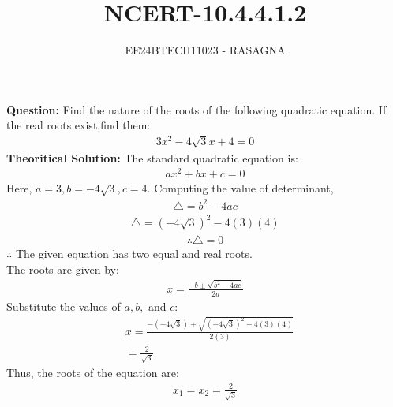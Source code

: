 \documentclass[journal]{IEEEtran}
\begin{document}

\vspace{3cm}

\title{NCERT-10.4.4.1.2}
\author{EE24BTECH11023 - RASAGNA}

{\let\newpage\relax\maketitle}

\renewcommand{\thefigure}{\theenumi}
\renewcommand{\thetable}{\theenumi}
\setlength{\intextsep}{10pt} %


\renewcommand{\thetable}{\theenumi}
\textbf{Question:}
Find the nature of the roots of the following quadratic equation. If the real roots exist,find them:
\begin{align*}
    3x^2-4{\sqrt{3}}x+4=0
\end{align*}
\textbf{Theoritical Solution:}
The standard quadratic equation is:
\begin{align}
    ax^2 + bx + c = 0
\end{align}
Here, \( a = 3, b = -4{\sqrt{3}}, c = 4 \).
Computing the value of determinant,
\begin{align}
    \triangle =b^2-4ac
\end{align}
\begin{align}
    \triangle =(-4{\sqrt{3}})^2-4(3)(4)
\end{align}
\begin{align}
    \therefore \triangle =0
\end{align}
$\therefore$ The given equation has two equal and real roots.\\
The roots are given by:
\begin{align}
    x = \frac{-b \pm \sqrt{b^2 - 4ac}}{2a}
\end{align}
Substitute the values of \( a, b, \) and \( c \):
\begin{align}
   & x = \frac{-(-4{\sqrt{3}}) \pm \sqrt{(-4{\sqrt{3}})^2 - 4(3)(4)}}{2(3)} \\
   & = \frac{2}{\sqrt{3}}
\end{align}
Thus, the roots of the equation are:
\begin{align}
x_1=x_2=\frac{2}{\sqrt{3}}
\end{align}
\end{document}
